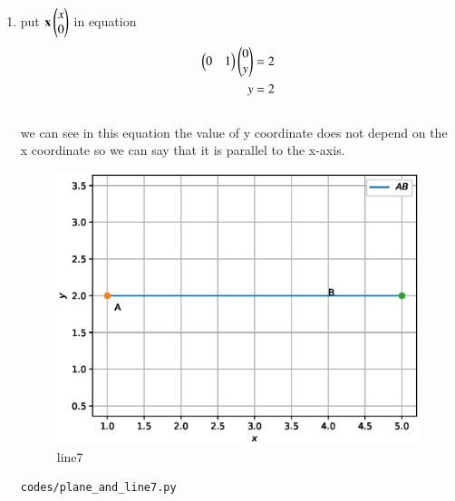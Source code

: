 \begin{enumerate}[label=\arabic*.,ref=\thesubsection.\theenumi]
\begin{enumerate}
\item put $\mathbf x \begin{pmatrix}x\\0\end{pmatrix}$ in equation 
\begin{align}
\begin{pmatrix}0& 1\end{pmatrix}\begin{pmatrix}0\\y\end{pmatrix} = 2
\\
y= 2
\end{align}
\\
we can see in this equation the  value of y coordinate does not depend on the x coordinate so we can say that it is parallel to the x-axis.
\begin{figure}[!ht]
	\centering
	\includegraphics[width=\columnwidth]{./figures/plane_and_line7.eps}
	\caption{line7 }
	\label{fig:line7}
\end{figure}
\begin{lstlisting}
codes/plane_and_line7.py
\end{lstlisting} 




\end{enumerate}
\end{enumerate}
